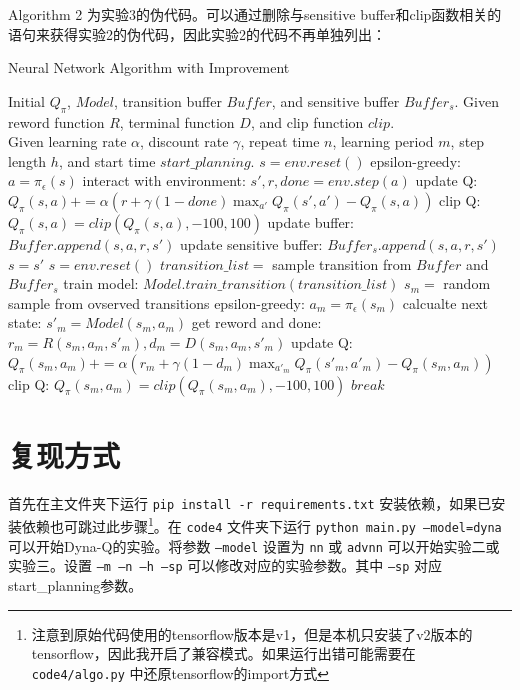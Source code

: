 \documentclass[a4paper,12pt]{article}
\begin{document}
\begin{CJK}{UTF8}{gbsn}
Algorithm 2 为实验3的伪代码。可以通过删除与sensitive buffer和clip函数相关的语句来获得实验2的伪代码，因此实验2的代码不再单独列出：
\newpage
\begin{algorithm}[H]
	\caption{Neural Network Algorithm with Improvement}
	\begin{algorithmic}[1]
		\STATE Initial $Q_\pi$, $Model$, transition buffer $Buffer$, and sensitive buffer $Buffer_s$. Given reword function $R$, terminal function $D$, and clip function $clip$. \\Given learning rate $\alpha$, discount rate $\gamma$, repeat time $n$, learning period $m$, step length $h$, and start time $start\_planning$.
		\STATE $s=env.reset()$
		\STATE epsilon-greedy: $a=\pi_\epsilon(s)$
		\STATE interact with environment: $s',r,done=env.step(a)$
		\STATE update Q: $Q_\pi(s,a)+=\alpha(r+\gamma(1-done)\max_{a'} Q_\pi(s',a')-Q_\pi(s,a))$
		\STATE clip Q: $Q_\pi(s,a)=clip(Q_\pi(s,a),-100,100)$
		\STATE update buffer: $Buffer.append(s,a,r,s')$
		\STATE update sensitive buffer: $Buffer_s.append(s,a,r,s')$
		\ENDIF
		\STATE $s=s'$
		\STATE $s=env.reset()$
		\ENDIF
		\ENDFOR
		\STATE $transition\_list=$ sample transition from $Buffer$ and $Buffer_s$
		\STATE train model: $Model.train\_transition(transition\_list)$
		\ENDFOR
		\STATE $s_m=$ random sample from ovserved transitions
		\STATE epsilon-greedy: $a_m=\pi_\epsilon(s_m)$
		\STATE calcualte next state: $s'_m=Model(s_m,a_m)$
		\STATE get reword and done: $r_m=R(s_m,a_m,s'_m),d_m=D(s_m,a_m,s'_m)$
		\STATE update Q: $Q_\pi(s_m,a_m)+=\alpha(r_m+\gamma (1-d_m)\max_{a'_m} Q_\pi(s'_m,a'_m)-Q_\pi(s_m,a_m))$
		\STATE clip Q: $Q_\pi(s_m,a_m)=clip(Q_\pi(s_m,a_m),-100,100)$
		\STATE $break$
		\ENDIF
		\ENDFOR
		\ENDFOR
		\ENDIF
		\ENDFOR
	\end{algorithmic}
\end{algorithm}
\section{复现方式}
首先在主文件夹下运行 \texttt{pip install -r requirements.txt} 安装依赖，如果已安装依赖也可跳过此步骤\footnote{注意到原始代码使用的tensorflow版本是v1，但是本机只安装了v2版本的tensorflow，因此我开启了兼容模式。如果运行出错可能需要在 \texttt{code4/algo.py} 中还原tensorflow的import方式}。在 \texttt{code4} 文件夹下运行 \texttt{python main.py --model=dyna} 可以开始Dyna-Q的实验。将参数 \texttt{--model} 设置为 \texttt{nn} 或 \texttt{advnn} 可以开始实验二或实验三。设置 \texttt{--m --n --h --sp} 可以修改对应的实验参数。其中 \texttt{--sp} 对应start\_planning参数。

\end{CJK}
\end{document}
